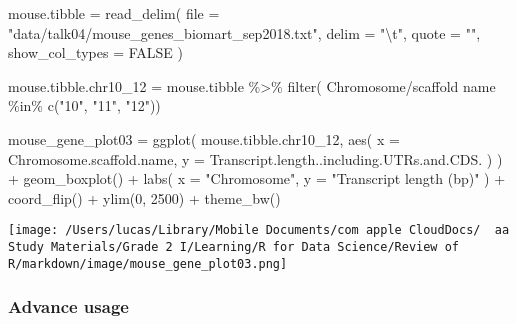\documentclass[
]{article}
\let\oldincludegraphics\includegraphics
\renewcommand{\includegraphics}[2][]{\begin{center}\oldincludegraphics[#1]{#2}\end{center}}
\newenvironment{Shaded}{}{}
\newcommand{\AttributeTok}[1]{\textcolor[rgb]{0.49,0.56,0.16}{#1}}
\newcommand{\ConstantTok}[1]{\textcolor[rgb]{0.53,0.00,0.00}{#1}}
\newcommand{\DecValTok}[1]{\textcolor[rgb]{0.25,0.63,0.44}{#1}}
\newcommand{\FunctionTok}[1]{\textcolor[rgb]{0.02,0.16,0.49}{#1}}
\newcommand{\NormalTok}[1]{#1}
\newcommand{\OtherTok}[1]{\textcolor[rgb]{0.00,0.44,0.13}{#1}}
\newcommand{\SpecialCharTok}[1]{\textcolor[rgb]{0.25,0.44,0.63}{#1}}
\newcommand{\StringTok}[1]{\textcolor[rgb]{0.25,0.44,0.63}{#1}}
\begin{document}
\begin{Shaded}
\begin{Highlighting}[]
\NormalTok{mouse.tibble }\OtherTok{=}
  \FunctionTok{read\_delim}\NormalTok{(}
    \AttributeTok{file =} \StringTok{"data/talk04/mouse\_genes\_biomart\_sep2018.txt"}\NormalTok{,}
    \AttributeTok{delim =} \StringTok{"}\SpecialCharTok{\textbackslash{}t}\StringTok{"}\NormalTok{,}
    \AttributeTok{quote =} \StringTok{""}\NormalTok{,}
    \AttributeTok{show\_col\_types =} \ConstantTok{FALSE}
\NormalTok{  )}

\NormalTok{mouse.tibble.chr10\_12 }\OtherTok{=}
\NormalTok{  mouse.tibble }\SpecialCharTok{\%\textgreater{}\%} \FunctionTok{filter}\NormalTok{(}
    \StringTok{\textasciigrave{}}\AttributeTok{Chromosome/scaffold name}\StringTok{\textasciigrave{}} \SpecialCharTok{\%in\%} \FunctionTok{c}\NormalTok{(}\StringTok{"10"}\NormalTok{, }\StringTok{"11"}\NormalTok{, }\StringTok{"12"}\NormalTok{))}


\NormalTok{mouse\_gene\_plot03 }\OtherTok{=}
    \FunctionTok{ggplot}\NormalTok{(}
\NormalTok{        mouse.tibble.chr10\_12,}
        \FunctionTok{aes}\NormalTok{(}
        \AttributeTok{x =}\NormalTok{ Chromosome.scaffold.name,}
        \AttributeTok{y =}\NormalTok{ Transcript.length..including.UTRs.and.CDS.}
\NormalTok{        )}
\NormalTok{    ) }\SpecialCharTok{+}
    \FunctionTok{geom\_boxplot}\NormalTok{() }\SpecialCharTok{+}
    \FunctionTok{labs}\NormalTok{(}
        \AttributeTok{x =} \StringTok{"Chromosome"}\NormalTok{,}
        \AttributeTok{y =} \StringTok{"Transcript length (bp)"}
\NormalTok{    ) }\SpecialCharTok{+}
    \FunctionTok{coord\_flip}\NormalTok{() }\SpecialCharTok{+}
    \FunctionTok{ylim}\NormalTok{(}\DecValTok{0}\NormalTok{, }\DecValTok{2500}\NormalTok{) }\SpecialCharTok{+}
    \FunctionTok{theme\_bw}\NormalTok{()}
\end{Highlighting}
\end{Shaded}

\texttt{[image: /Users/lucas/Library/Mobile Documents/com~apple~CloudDocs/~~aa Study Materials/Grade 2 I/Learning/R for Data Science/Review of R/markdown/image/mouse\_gene\_plot03.png]}

\hypertarget{advance-usage}{%
\subsubsection{Advance usage}\label{advance-usage}}
\end{document}
